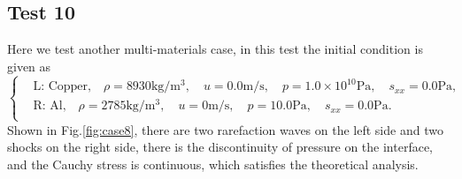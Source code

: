 \documentclass{article}
\numberwithin{equation}{section}
\numberwithin{table}{section}
\begin{document}
\subsection{Test 10}
Here we test another multi-materials case, in this test the initial condition is given as
\begin{equation}
 \left\{ \begin{aligned}
	 &	 \text{L: Copper,}\quad  \rho = 8930 \text{kg}/\text{m}^3, \quad  u = 0.0\text{m}/\text{s}, \quad  p = 1.0\times 10^{10}\text{Pa}, \quad  s_{xx}=0.0 \text{Pa},\\
	 &	 \text{R: Al,}\quad  \rho = 2785 \text{kg}/\text{m}^3, \quad  u = 0\text{m}/\text{s}, \quad  p = 10.0 \text{Pa}, \quad  s_{xx}=0.0 \text{Pa}.\\
   \end{aligned}
 \right.
\end{equation}
Shown in Fig.\ref{fig:case8}, there are two rarefaction waves on the left side and two shocks on the right side, there is the discontinuity of pressure on the interface, and the Cauchy stress is continuous, which  satisfies the theoretical analysis.
\end{document}
